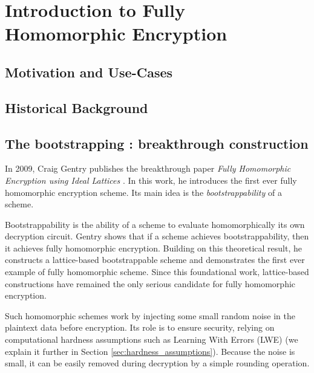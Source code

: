 
\chapter{Introduction to Fully Homomorphic Encryption}


\section{Motivation and Use-Cases}


\TODO{}


\section{Historical Background}



\TODO{}




\section{The bootstrapping : breakthrough construction}
\label{sec:gentry_bootstrapping}


In 2009, Craig Gentry publishes the breakthrough paper \textit{Fully Homomorphic Encryption using Ideal Lattices} \cite{STOC:Gentry09}. In this work, he introduces the first ever fully homomorphic encryption scheme. Its main idea is the \textit{bootstrappability} of a scheme.

Bootstrappability is the ability of a scheme to evaluate homomorphically its own decryption circuit. Gentry shows that if a scheme achieves bootstrappability, then it achieves fully homomorphic encryption. Building on this theoretical result, he constructs a lattice-based bootstrappable scheme and demonstrates the first ever example of fully homomorphic scheme. Since this foundational work, lattice-based constructions have remained the only serious candidate for fully homomorphic encryption. 

Such homomorphic schemes work by injecting some small random noise in the plaintext data before encryption. Its role is to ensure security, relying on computational hardness assumptions such as Learning With Errors (LWE) (we explain it further in Section \ref{sec:hardness_assumptions}). Because the noise is small, it can be easily removed during decryption by a simple rounding operation. 

